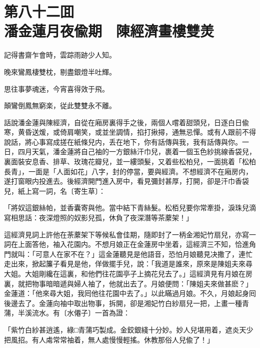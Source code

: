 
\chapter*{第八十二囬　\\潘金蓮月夜偸期　陳經濟畫樓雙羙}


\begin{myquote}
記得書齋乍會時，雲踪雨跡少人知。

晚來鸞鳳棲雙枕，剔盡銀燈半吐輝。

思往事夢魂迷，今宵喜得效于飛。

顛鸞倒鳳無窮楽，従此雙雙永不離。
\end{myquote}

話說潘金蓮與陳經濟，自從在廂房裏得手之後，兩個人嚐着甜頭兒，日逐白日偸寒，黄昏送煖，或倚肩嘲笑，或並坐調情，掐打揪撏，通無忌憚。或有人跟前不得說話，將心事寫成搓在紙條兒内，丢在地下，你有話傳與我，我有話傳與你。一日，四月天氣，潘金蓮將自己袖的一方銀絲汗巾兒，裹着一個玉色紗挑線香袋兒，裏面裝安息香、排草、玫瑰花瓣兒，並一縷頭髮，又着些松柏兒，一面挑着「松柏長青」，一面是「人面如花」八字，封的停當，要與經濟。不想經濟不在廂房内，遂打窗眼内投進去。後經濟開門進入房中，看見彌封甚厚，打開，卻是汗巾香袋兒，紙上寫一詞，名〔寄生草〕：

\begin{myquote}
「將奴這銀絲帕，並香囊寄與他。當中結下青絲髮。松栢兒要你常牽掛，淚珠兒滴寫相思話：夜深燈照的奴影兒孤，休負了夜深潛等茶䕷架！」
\end{myquote}

這經濟見詞上許他在荼䕷架下等候私會佳期，隨即封了一柄金湘妃竹扇兒，亦寫一詞在上面答他，袖入花園内。不想月娘正在金蓮房中坐着，這經濟三不知，恰進角門就叫：「可意人在家不在？」這金蓮聽見是他語音，恐怕月娘聽見决撒了，連忙走出來，掀起簾子看見是他，佯做擺手兒，說：「我道是誰來，原來是陳姐夫來尋大姐。大姐剛纔在這裏，和他們往花園亭子上摘花兒去了。」這經濟見有月娘在房裏，就把物事暗暗遞與婦人袖了，他就出去了。月娘便問：「陳姐夫來做甚麽？」金蓮道：「他來尋大姐，我囘他往花園中去了。」以此瞞過月娘。不久，月娘起身囘後邊去了。金蓮向袖中取出物事，拆開，卻是湘妃竹白紗扇兒一把，上畫一種青蒲，半溪流水。有〔水僊子〕一首為證：

\begin{myquote}
「紫竹白紗甚逍遙，綠□青蒲巧製成。金鉸銀綫十分妙。妙人兒堪用着，遮炎天少把風招。有人䖏常常袖着，無人處慢慢輕搖。休教那俗人兒偸了！」
\end{myquote}

